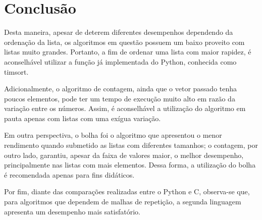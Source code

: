 \section{Conclusão}
Desta maneira, apesar de deterem diferentes desempenhos dependendo da ordenação da lista, os algoritmos em questão possuem um baixo proveito com listas muito grandes. Portanto, a fim de ordenar uma lista com maior rapidez, é aconselhável utilizar a função já implementada do Python, conhecida como timsort.

Adicionalmente, o algoritmo de contagem, ainda que o vetor passado tenha poucos elementos, pode ter um tempo de execução muito alto em razão da variação entre os números. Assim, é aconselhável a utilização do algoritmo em pauta apenas com listas com uma exígua variação.

Em outra perspectiva, o bolha foi o algoritmo que apresentou o menor rendimento quando submetido as listas com diferentes tamanhos; o contagem, por outro lado, garantiu, apesar da faixa de valores maior, o melhor desempenho, principalmente nas listas com mais elementos. Dessa forma, a utilização do bolha é recomendada apenas para fins didáticos.


Por fim, diante das comparações realizadas entre o Python e C, observa-se que, para algoritmos que dependem de malhas de repetição, a segunda linguagem apresenta um desempenho mais satisfatório.